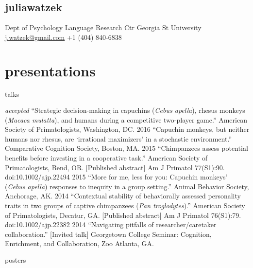 \documentclass[]{friggeri-cv}
\begin{document}
\begin{aside}
  \section{{\normalfont julia}watzek}
    Dept of Psychology
    Language Research Ctr
    Georgia St University
    ~
    \href{mailto:j.watzek@gmail.com}{j.watzek@gmail.com}
    +1 (404) 840-6838
\end{aside}



\section{presentations}


{\subfont\large{} talks}

\begin{entrylist2}
  \entrytwo
    {\emph{accepted}}
    {``Strategic decision-making in capuchins (\emph{Cebus apella}), rhesus monkeys (\emph{Macaca mulatta}), and humans during a competitive two-player game.'' American Society of Primatologists, Washington, DC.}
  \entrytwo
    {2016}
    {``Capuchin monkeys, but neither humans nor rhesus, are `irrational maximizers' in a stochastic environment.'' Comparative Cognition Society, Boston, MA.}
  \entrytwo
    {2015}
    {``Chimpanzees assess potential benefits before investing in a cooperative task.'' American Society of Primatologists, Bend, OR. [Published abstract] Am J Primatol 77(S1):90. doi:10.1002/ajp.22494}
  \entrytwo
    {2015}
    {``More for me, less for you: Capuchin monkeys' (\emph{Cebus apella}) responses to inequity in a group setting.'' Animal Behavior Society, Anchorage, AK.}
  \entrytwo
    {2014}
    {``Contextual stability of behaviorally assessed personality traits in two groups of captive chimpanzees (\emph{Pan troglodytes}).'' American Society of Primatologists, Decatur, GA. [Published abstract] Am J Primatol 76(S1):79. doi:10.1002/ajp.22382}
  \entrytwo
    {2014}
    {``Navigating pitfalls of researcher/caretaker collaboration.'' [Invited talk] Georgetown College Seminar: Cognition, Enrichment, and Collaboration, Zoo Atlanta, GA.}
\end{entrylist2}


{\subfont\large{} posters}
\end{document}
